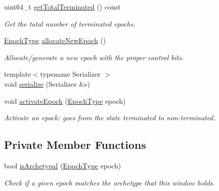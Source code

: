 \begin{DoxyCompactItemize}
uint64\+\_\+t \hyperlink{structvt_1_1epoch_1_1_epoch_window_a55dc39196c78f85094d97b61149bfcba}{get\+Total\+Terminated} () const
\begin{DoxyCompactList}\small\item\em Get the total number of terminated epochs. \end{DoxyCompactList}\item 
\hyperlink{structvt_1_1epoch_1_1_epoch_type}{Epoch\+Type} \hyperlink{structvt_1_1epoch_1_1_epoch_window_a0c18249fdbc30c5e4ee0de6949a320a4}{allocate\+New\+Epoch} ()
\begin{DoxyCompactList}\small\item\em Allocate/generate a new epoch with the proper control bits. \end{DoxyCompactList}\item 
{\footnotesize template$<$typename Serializer $>$ }\\void \hyperlink{structvt_1_1epoch_1_1_epoch_window_a584f6dedf7cc4d28a8a153348a2f5c2c}{serialize} (Serializer \&s)
\item 
void \hyperlink{structvt_1_1epoch_1_1_epoch_window_a6efc8f11ec346d89ebbfcb36069b6e78}{activate\+Epoch} (\hyperlink{structvt_1_1epoch_1_1_epoch_type}{Epoch\+Type} epoch)
\begin{DoxyCompactList}\small\item\em Activate an epoch\+: goes from the state terminated to non-\/terminated. \end{DoxyCompactList}\end{DoxyCompactItemize}
\subsection*{Private Member Functions}
\begin{DoxyCompactItemize}
\item 
bool \hyperlink{structvt_1_1epoch_1_1_epoch_window_a9f6b34a8ba87a8a4e6669b3b09958ba2}{is\+Archetypal} (\hyperlink{structvt_1_1epoch_1_1_epoch_type}{Epoch\+Type} epoch)
\begin{DoxyCompactList}\small\item\em Check if a given epoch matches the archetype that this window holds. \end{DoxyCompactList}\end{DoxyCompactItemize}
